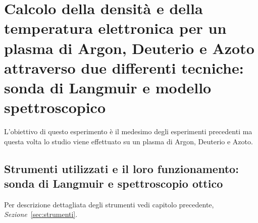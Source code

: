 \chapter{Calcolo della densità e della temperatura elettronica per un plasma di Argon, Deuterio e Azoto attraverso due differenti tecniche: sonda di Langmuir e modello spettroscopico}

L'obiettivo di questo esperimento è il medesimo degli esperimenti precedenti ma questa volta lo studio viene effettuato su un plasma di Argon, Deuterio e Azoto.

\section{Strumenti utilizzati e il loro funzionamento: sonda di Langmuir e spettroscopio ottico}
Per descrizione dettagliata degli strumenti vedi capitolo precedente, \textit{Sezione}~\ref{sec:strumenti}.

